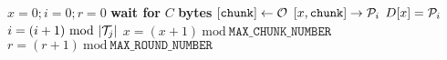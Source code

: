\documentclass{article}
\begin{document}
\pagestyle{empty}

\newcommand{\send}{\Rightarrow}
\newcommand{\sendto}{\rightarrow}
\newcommand{\recv}{\Leftarrow}
\algrenewcommand{}

\begin{algorithmic}

  \State $x=0; i=0; r=0$
  \State \textbf{wait for} $C$ \textbf{bytes} $[\mathtt{chunk}] \gets {\cal O}$
  \State $[x,\mathtt{chunk}] \sendto {\cal P}_i$
  \State $D[x]={\cal P}_i$
  \State $i=(i+1)~\text{mod}~|{\cal T}_j|$
  \State $x=(x+1)~\text{mod}~\mathtt{MAX\_CHUNK\_NUMBER}$
  $r=(r+1)~\text{mod}~\mathtt{MAX\_ROUND\_NUMBER}$
  \EndIf
  \EndWhile
  \EndProcedure
  
\end{algorithmic}
\end{document}
